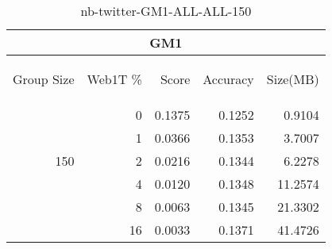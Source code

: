 \begin{center}
\begin{table}[htbp] 
 \begin{center}
\begin{tabular}{ | r | r | r | r | r |}
\hline
\multicolumn{5}{|c|}{GM1}\\
\hline
\begin{sideways}Group Size\end{sideways} & \begin{sideways}Web1T \%\end{sideways} & \begin{sideways}Score\end{sideways} & \begin{sideways}Accuracy\end{sideways} & \begin{sideways}Size(MB)\end{sideways}\\
\hline
\multirow{5}{*}{150}
 & 0 & 0.1375 & 0.1252 & 0.9104\\ \cline{2-5}
 & 1 & 0.0366 & 0.1353 & 3.7007\\ \cline{2-5}
 & 2 & 0.0216 & 0.1344 & 6.2278\\ \cline{2-5}
 & 4 & 0.0120 & 0.1348 & 11.2574\\ \cline{2-5}
 & 8 & 0.0063 & 0.1345 & 21.3302\\ \cline{2-5}
 & 16 & 0.0033 & 0.1371 & 41.4726\\ \cline{2-5}
\hline
\end{tabular}
\caption{nb-twitter-GM1-ALL-ALL-150}
\label{table:nb-twitter-GM1-ALL-ALL-150}
\end{center}
 \end{table}
\end{center}

